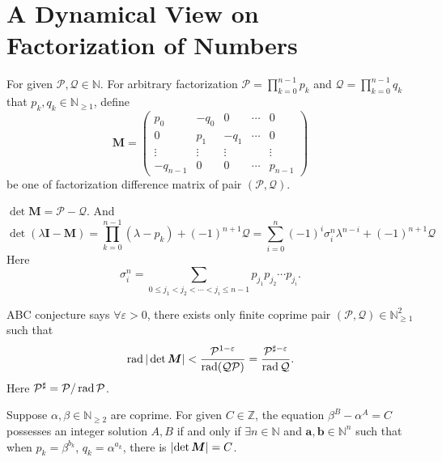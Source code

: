 \section{A Dynamical View on Factorization of Numbers}\label{sec:a-dynamical-view-on-factorization-of-numbers}

\begin{definition}\label{def:factorization-matrix}
	For given $\mathcal{P}, \mathcal{Q} \in \mathbb{N}$. For arbitrary factorization $\mathcal{P} = \prod_{k=0}^{n-1}p_k$ and $\mathcal{Q} = \prod_{k=0}^{n-1}q_k$ that $p_k, q_k \in \mathbb{N}_{\ge 1}$, define
\[ \bm{M} = \begin{pmatrix}
	p_{0} & -q_0 & 0 & \cdots & 0 \\
	0 & p_1 & -q_1 & \cdots & 0 \\
	\vdots & \vdots & \vdots & & \vdots \\
	-q_{n-1} & 0 & 0 & \cdots & p_{n-1}
\end{pmatrix} \]
be one of factorization difference matrix of pair $(\mathcal{P}, \mathcal{Q})$.
\end{definition}
\begin{proposition}\label{prop:det-factorization-matrix-is-diff}
	$\det\bm{M} = \mathcal{P} - \mathcal{Q}$. And
	\[ \det(\lambda\bm{I} - \bm{M}) = \prod_{k=0}^{n-1}(\lambda - p_k) + (-1)^{n+1}\mathcal{Q}  = \sum_{i=0}^{n}(-1)^{i}\sigma_{i}^{n}\lambda^{n-i} + (-1)^{n+1}\mathcal{Q} \]
	Here
	\[ \sigma_{i}^{n} = \sum_{0\le j_1 < j_2 < \cdots < j_i \le n-1} p_{j_1}p_{j_2}\cdots p_{j_i}. \]
\end{proposition}
\begin{example}\label{exa:rewitten-abc-conjecture}
	ABC conjecture says $\forall \varepsilon > 0$, there exists only finite coprime pair $(\mathcal{P}, \mathcal{Q}) \in \mathbb{N}_{\ge 1}^{2}$ such that
	\[ \operatorname{rad}\vert\det\bm{M}\vert < \frac{\mathcal{P}^{1-\varepsilon}}{\operatorname{rad}(\mathcal{Q}\mathcal{P})} = \frac{\mathcal{P}^{\sharp-\varepsilon}}{\operatorname{rad}\mathcal{Q}}. \]
	Here $\mathcal{P}^{\sharp} = \mathcal{P} / \operatorname{rad}\mathcal{P}$.
\end{example}
\begin{example}\label{exa:power-diff-to-dynamical-system}
	Suppose $\alpha, \beta \in \mathbb{N}_{\ge2}$ are coprime. For given $C \in \mathbb{Z}$, the equation $\beta^{B} - \alpha^{A} = C$ possesses an integer solution $A, B$ if and only if $\exists n \in \mathbb{N}$ and $\bm{a}, \bm{b} \in \mathbb{N}^{n}$ such that when $p_k = \beta^{b_k}$, $q_k = \alpha^{a_k}$, there is $\lvert\det\bm{M}\rvert = C$.
\end{example}
